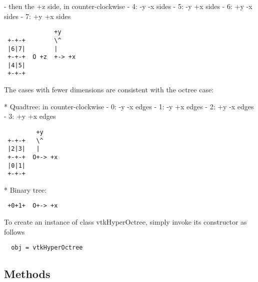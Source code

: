  - then the +z side, in counter-clockwise
 - 4: -y -x sides
 - 5: -y +x sides
 - 6: +y -x sides
 - 7: +y +x sides
 \begin{verbatim}
              +y
 +-+-+        \^
 |6|7|        |
 +-+-+  O +z  +-> +x
 |4|5|
 +-+-+
 \end{verbatim}

 The cases with fewer dimensions are consistent with the octree case:

 * Quadtree:
 in counter-clockwise
 - 0: -y -x edges
 - 1: -y +x edges
 - 2: +y -x edges
 - 3: +y +x edges
 \begin{verbatim}
         +y
 +-+-+   \^
 |2|3|   |
 +-+-+  O+-> +x
 |0|1|
 +-+-+
 \end{verbatim}

 * Binary tree:
 \begin{verbatim}
 +0+1+  O+-> +x
 \end{verbatim}


To create an instance of class vtkHyperOctree, simply
invoke its constructor as follows
\begin{verbatim}
  obj = vtkHyperOctree
\end{verbatim}
\subsection{Methods}

